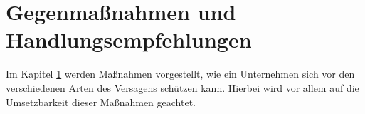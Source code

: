 \newpage
\section{Gegenmaßnahmen und Handlungsempfehlungen} \label{massnahmen}

Im Kapitel \ref{massnahmen} werden Maßnahmen vorgestellt, wie ein Unternehmen sich vor den
verschiedenen Arten des Versagens schützen kann. Hierbei wird vor allem auf die
Umsetzbarkeit dieser Maßnahmen geachtet.


